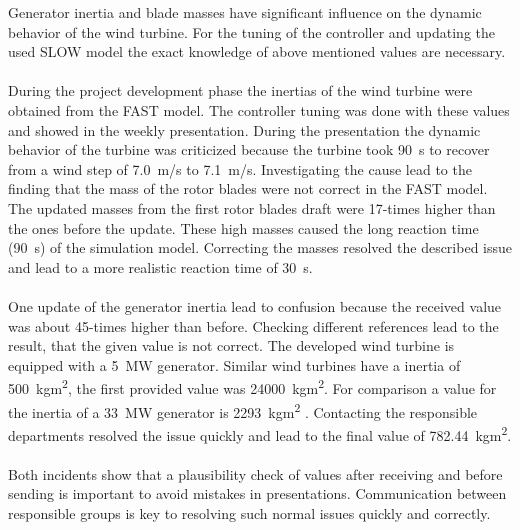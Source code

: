 Generator inertia and blade masses have significant influence on the dynamic behavior of the wind turbine.
For the tuning of the controller and updating the used \gls{SLOW} model the exact knowledge of above mentioned values are necessary.
\\
\\
During the project development phase the inertias of the wind turbine were obtained from the \gls{FAST} model. The controller tuning was done with these values and showed in the weekly presentation.
During the presentation the dynamic behavior of the  turbine was criticized because the turbine took \SI{90}{s} to recover from a wind step of \SI{7.0}{m/s} to \SI{7.1}{m/s}. 
Investigating the cause lead to the finding that the mass of the rotor blades were not correct in the \gls{FAST} model.
The updated masses from the first rotor blades draft were 17-times higher than the ones before the update.
These high masses caused the long reaction time (\SI{90}{s}) of the simulation model.
Correcting the masses resolved the described issue and lead to a more realistic reaction time of \SI{30}{s}.
\\
\\
One update of the generator inertia lead to confusion because the received value was about 45-times higher than before.
Checking different references lead to the result, that the given value is not correct.
The developed wind turbine is equipped with a \SI{5}{MW} generator.
Similar wind turbines have a inertia of \SI{500}{kgm^2}, the first provided value was \SI{24000}{kgm^2}. For comparison a value for the inertia of a \SI{33}{MW} generator is \SI{2293}{kgm^2} \cite{InertiaJauchPaper}.
Contacting the responsible departments resolved the issue quickly and lead to the final value of \SI{782.44}{kgm^2}.
\\
\\
Both incidents show that a plausibility check of values after receiving and before sending is important to avoid mistakes in presentations.
Communication between responsible groups is key to resolving such normal issues quickly and correctly.
